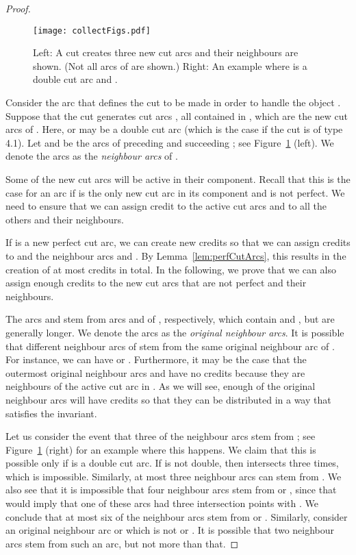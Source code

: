 \documentclass{article}
\begin{document}
\begin{proof}
\begin{figure}
\centering
\texttt{[image: collectFigs.pdf]}
\caption{Left: A cut creates three new cut arcs  and their neighbours  are shown. (Not all arcs of  are shown.)
Right: An example where  is a double cut arc and .}
\label{fig:arcAB}
\end{figure}

Consider the arc  that defines the cut to be made in order to handle the object .
Suppose that the cut generates  cut arcs , all contained in , which are the new cut arcs of .
Here,  or  may be a double cut arc (which is the case if the cut is of type 4.1).
Let  and  be the arcs of  preceding and succeeding ; see Figure~\ref{fig:arcAB} (left).
We denote the arcs  as the \emph{neighbour arcs} of .

Some of the new cut arcs  will be active in their component.
Recall that this is the case for an arc  if  is the only new cut arc in its component and  is not perfect.
We need to ensure that we can assign  credit to the active cut arcs and  to all the others and their neighbours.

If  is a new perfect cut arc, we can create  new credits so that we can assign  credits to  and the neighbour arcs  and .
By Lemma~\ref{lem:perfCutArcs}, this results in the creation of at most  credits in total.
In the following, we prove that we can also assign enough credits to the new cut arcs that are not perfect and their neighbours.

The arcs  and  stem from arcs  and  of , respectively, which contain  and , but are generally longer.
We denote the arcs  as the \emph{original neighbour arcs}.
It is possible that different neighbour arcs of  stem from the same original neighbour arc of .
For instance, we can have  or .
Furthermore, it may be the case that the outermost original neighbour arcs  and  have no credits because they are neighbours of the active cut arc  in .
As we will see, enough of the original neighbour arcs will have  credits so that they can be distributed in a way that satisfies the invariant.

Let us consider the event that three of the neighbour arcs stem from ; see Figure~\ref{fig:arcAB} (right) for an example where this happens.
We claim that this is possible only if 
 is a double cut arc.
If 
 is not double, then  intersects  three times, which is impossible.
Similarly, at most three neighbour arcs can stem from .
We also see that it is impossible that four neighbour arcs stem from  or , since that would imply that one of these arcs had three intersection points with .
We conclude that at most six of the neighbour arcs stem from  or .
Similarly, consider an original neighbour arc  or  which is not  or .
It is possible that two neighbour arcs stem from such an arc, but not more than that.


\end{proof}
\end{document}
